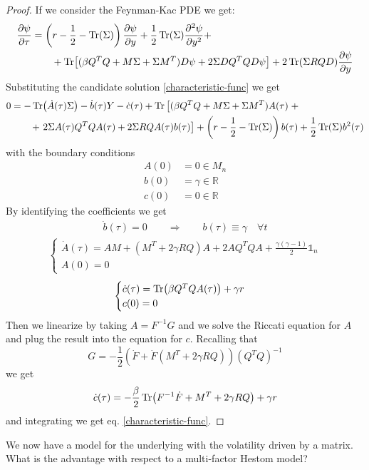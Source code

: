 \begin{proof}
    If we consider the Feynman-Kac PDE we get:
    \begin{align*}
        \pdv{\psi}{\tau} &= \left(r-\frac{1}{2}-\Tr(\Sigma)\right)\pdv{\psi}{y} + \frac{1}{2}\Tr(\Sigma)\pdv[2]{\psi}{y} + \\
        &\qquad
        + \Tr[(\beta Q^TQ + M\Sigma + \Sigma M^T)D\psi + 2\Sigma DQ^TQD\psi] + 2\Tr(\Sigma RQD)\pdv{\psi}{y}
    \end{align*}
    Substituting the candidate solution \eqref{characteristic-func} we get
    \begin{align*}
        0 &= -\Tr(\dot{A}(\tau)\Sigma) - \dot{b}(\tau)Y - \dot{c}(\tau) + \Tr\left[(\beta Q^TQ + M\Sigma + \Sigma M^T)A(\tau)\right. + \\
        &\qquad
        + \left. 2\Sigma A(\tau)Q^TQA(\tau)+2\Sigma RQA(\tau)b(\tau)\right] + \left(r-\frac{1}{2}-\Tr(\Sigma)\right)b(\tau) + \frac{1}{2}\Tr(\Sigma)b^2(\tau)
    \end{align*}
    with the boundary conditions
    \begin{align*}
        A(0) &= 0 \in M_n \\
        b(0) &= \gamma \in \mathbb{R} \\
        c(0) &= 0 \in \mathbb{R}
    \end{align*}
    By identifying the coefficients we get
    \begin{align*}
        \dot{b}(\tau) = 0 \qquad\Rightarrow\qquad b(\tau) \equiv \gamma \quad\forall t
    \end{align*}
    \begin{align*}
        \begin{cases}
            \dot{A}(\tau) = AM + (M^T+2\gamma RQ)A + 2AQ^TQA + \frac{\gamma(\gamma-1)}{2}\mathds{1}_n \\
            A(0) = 0
        \end{cases}
    \end{align*}
    \begin{equation*}
        \begin{cases}
            \dot{c}(\tau) = \Tr(\beta Q^TQA(\tau)) + \gamma r \\
            c(0) = 0
        \end{cases}
    \end{equation*}
    Then we linearize by taking $A = F^{-1}G$ and we solve the Riccati equation for $A$ and plug the result into the equation for $c$. Recalling that
    \begin{equation*}
        G = -\frac{1}{2}\left(\dot{F}+\dot{F}(M^T+2\gamma RQ)\right)(Q^TQ)^{-1}
    \end{equation*}
    we get
    \begin{equation*}
        \dot{c}(\tau) = -\frac{\beta}{2}\Tr(F^{-1}\dot{F} + M^T + 2\gamma RQ) + \gamma r
    \end{equation*}
    and integrating we get eq. \eqref{characteristic-func}.
\end{proof}
We now have a model for the underlying with the volatility driven by a matrix. What is the advantage with respect to a multi-factor Hestom model?

